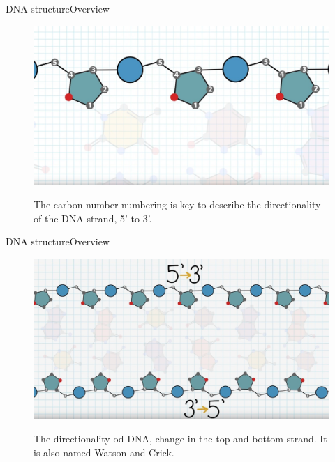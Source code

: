 \documentclass[10pt]{beamer}
\begin{document}
{%
\begin{frame}{DNA structure}{Overview}
	\begin{figure}[]
		\centering
		\includegraphics[width=\textwidth,height=0.7\textheight,keepaspectratio]{img/introduction/dna16.jpg}
		\label{img:mot2}
		\caption{The carbon number numbering is key to describe the directionality of the DNA strand, 5' to 3'.}
	\end{figure}
\end{frame}

\begin{frame}{DNA structure}{Overview}
	\begin{figure}[]
		\centering
		\includegraphics[width=\textwidth,height=0.7\textheight,keepaspectratio]{img/introduction/dna17.jpg}
		\label{img:mot2}
		\caption{The directionality od DNA, change in the top and bottom strand. It is also named Watson and Crick. }
	\end{figure}
\end{frame}

}
\end{document}
